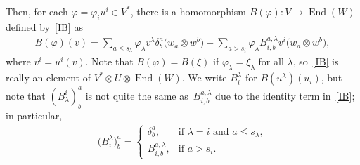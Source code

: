 \documentclass[11pt]{article}
\numberwithin{equation}{section}
\DeclareMathOperator{\End}{End}
\begin{document}
Then, for each $\varphi=\varphi_i u^i \in V^*$, there is a homomorphism $B(\varphi)\colon V \to
\End(W)$ def\/ined by~\eqref{IB} as
\begin{gather*}
B(\varphi)(v) =
\sum_{a \leq s_\lambda}
\varphi_\lambda v^\lambda \delta^a_b \big(w_a \otimes w^b\big) +
\sum_{a>s_i} \varphi_\lambda B^{a,\lambda}_{i,b} v^i \big(w_a \otimes w^b\big),
\label{IBphi}
\end{gather*}
where $v^i = u^i(v)$.  Note that $B(\varphi) = B(\xi)$ if $\varphi_\lambda = \xi_\lambda$ for all
$\lambda$, so~\eqref{IB} is really an element of $V^* \otimes U \otimes
\End(W)$.
We write $B^\lambda_i$ for $B(u^\lambda)(u_i)$, but note that
$(B_\lambda^i)^a_b$ is not
quite the same as~$B^{a,\lambda}_{i,b}$  due to the identity term in~\eqref{IB}; in particular,
\begin{gather*}
\big(B^\lambda_i\big)^a_b =
\begin{cases}
\delta^a_b, & \text{if $\lambda=i$ and $a \leq s_\lambda$},\\
B^{a,\lambda}_{i,b}, & \text{if $a>s_i$}.
\end{cases}
\label{IBcomp}
\end{gather*}
\end{document}
